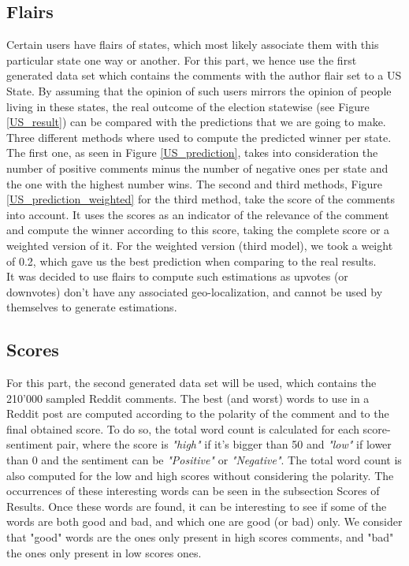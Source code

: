 \documentclass[11pt]{article}
\begin{document}
\subsection{Flairs}
Certain users have flairs of states, which most likely associate them with this particular state one way or another. For this part, we hence use the first generated data set which contains the comments with the author flair set to a US State. By assuming that the opinion of such users mirrors the opinion of people living in these states, the real outcome of the election statewise (see Figure \ref{US_result}) can be compared with the predictions that we are going to make. Three different methods where used to compute the predicted winner per state. \\
The first one, as seen in Figure \ref{US_prediction}, takes into consideration the number of positive comments minus the number of negative ones per state and the one with the highest number wins. 
The second and third methods, Figure  \ref{US_prediction_weighted} for the third method, take the score of the comments into account. It uses the scores as an indicator of the relevance of the comment and compute the winner according to this score, taking the complete score or a weighted version of it. For the weighted version (third model), we took a weight of 0.2, which gave us the best prediction when comparing to the real results. \\
It was decided to use flairs to compute such estimations as upvotes (or downvotes) don't have any associated geo-localization, and cannot be used by themselves to generate estimations.

\subsection{Scores}
For this part, the second generated data set will be used, which contains the 210'000 sampled Reddit comments. The best (and worst) words to use in a Reddit post are computed according to the polarity of the comment and to the final obtained score. To do so, the total word count is calculated for each score-sentiment pair, where the score is \textit{"high"} if it's bigger than 50 and \textit{"low"} if lower than 0 and the sentiment can be \textit{"Positive"} or \textit{"Negative"}. The total word count is also computed for the low and high scores without considering the polarity. The occurrences of these interesting words can be seen in the subsection Scores of Results. Once these words are found, it can be interesting to see if some of the words are both good and bad, and which one are good (or bad) only. We consider that "good" words are the ones only present in high scores comments, and "bad" the ones only present in low scores ones.
\end{document}
